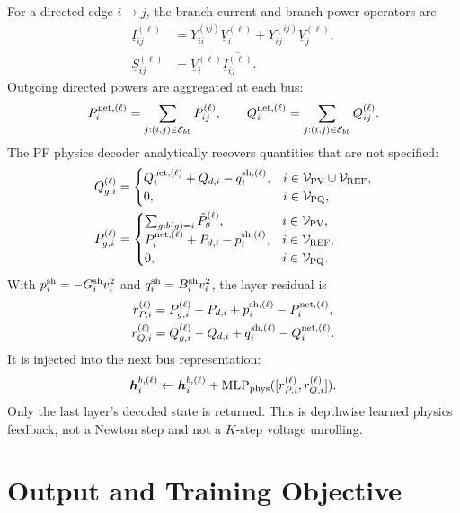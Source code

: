 \documentclass[10pt]{article}
\newcommand{\MLP}{\operatorname{MLP}}
\begin{document}
For a directed edge \(i\to j\), the branch-current and branch-power operators are
\begin{align}
 \underline I_{ij}^{(\ell)}&=Y_{ii}^{(ij)}\underline V_i^{(\ell)}+
 Y_{ij}^{(ij)}\underline V_j^{(\ell)},\\
 \underline S_{ij}^{(\ell)}&=\underline V_i^{(\ell)}
 \overline{\underline I_{ij}^{(\ell)}}.
\end{align}
Outgoing directed powers are aggregated at each bus:
\begin{equation}
 P_i^{\rm net,(\ell)}=\sum_{j:(i,j)\in\mathcal E_{bb}}P_{ij}^{(\ell)},\qquad
 Q_i^{\rm net,(\ell)}=\sum_{j:(i,j)\in\mathcal E_{bb}}Q_{ij}^{(\ell)}.
\end{equation}
The PF physics decoder analytically recovers quantities that are not specified:
\begin{align}
 Q_{g,i}^{(\ell)}&=
 \begin{cases}
 Q_i^{\rm net,(\ell)}+Q_{d,i}-q_i^{\rm sh,(\ell)},
 &i\in\mathcal V_{\rm PV}\cup\mathcal V_{\rm REF},\\0,&i\in\mathcal V_{\rm PQ},
 \end{cases}\\
 P_{g,i}^{(\ell)}&=
 \begin{cases}
 \sum_{g:b(g)=i}\tilde P_g^{(\ell)},&i\in\mathcal V_{\rm PV},\\
 P_i^{\rm net,(\ell)}+P_{d,i}-p_i^{\rm sh,(\ell)},&i\in\mathcal V_{\rm REF},\\
 0,&i\in\mathcal V_{\rm PQ}.
 \end{cases}
\end{align}
With \(p_i^{\rm sh}=-G_i^{\rm sh}v_i^2\) and
\(q_i^{\rm sh}=B_i^{\rm sh}v_i^2\), the layer residual is
\begin{align}
 r_{P,i}^{(\ell)}&=P_{g,i}^{(\ell)}-P_{d,i}+p_i^{\rm sh,(\ell)}-P_i^{\rm net,(\ell)},\\
 r_{Q,i}^{(\ell)}&=Q_{g,i}^{(\ell)}-Q_{d,i}+q_i^{\rm sh,(\ell)}-Q_i^{\rm net,(\ell)}.
\end{align}
It is injected into the next bus representation:
\begin{equation}
 \bm h_i^{b,(\ell)}\leftarrow \bm h_i^{b,(\ell)}+
 \MLP_{\rm phys}([r_{P,i}^{(\ell)},r_{Q,i}^{(\ell)}]).
\end{equation}
Only the last layer's decoded state is returned. This is depthwise learned
physics feedback, not a Newton step and not a \(K\)-step voltage unrolling.

\section{Output and Training Objective}
\end{document}
